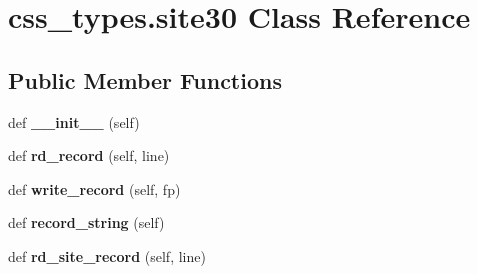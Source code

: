 \hypertarget{classcss__types_1_1site30}{}\section{css\+\_\+types.\+site30 Class Reference}
\label{classcss__types_1_1site30}
\subsection*{Public Member Functions}
\begin{DoxyCompactItemize}
\item 
\hypertarget{classcss__types_1_1site30_af8e0ab29a892016352d4c07c4b1cffcc}{}def {\bfseries \+\_\+\+\_\+init\+\_\+\+\_\+} (self)\label{classcss__types_1_1site30_af8e0ab29a892016352d4c07c4b1cffcc}

\item 
\hypertarget{classcss__types_1_1site30_a123301b26a6880c4a50244ca7cb26c6a}{}def {\bfseries rd\+\_\+record} (self, line)\label{classcss__types_1_1site30_a123301b26a6880c4a50244ca7cb26c6a}

\item 
\hypertarget{classcss__types_1_1site30_acb1269ca42c5e43ea308985194e95590}{}def {\bfseries write\+\_\+record} (self, fp)\label{classcss__types_1_1site30_acb1269ca42c5e43ea308985194e95590}

\item 
\hypertarget{classcss__types_1_1site30_a2ba60214332a166901c5573defa0a607}{}def {\bfseries record\+\_\+string} (self)\label{classcss__types_1_1site30_a2ba60214332a166901c5573defa0a607}

\item 
\hypertarget{classcss__types_1_1site30_ae69b9ea7b851d9ba4a15bab93c35febf}{}def {\bfseries rd\+\_\+site\+\_\+record} (self, line)\label{classcss__types_1_1site30_ae69b9ea7b851d9ba4a15bab93c35febf}

\end{DoxyCompactItemize}
